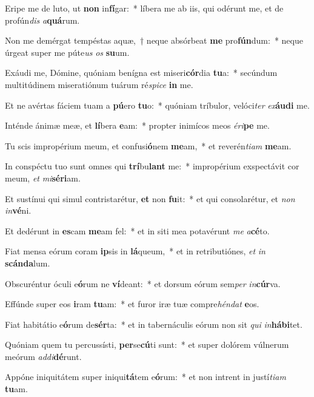 \item Eripe me de luto, ut \textbf{non} in\textbf{fí}gar:~* líbera me ab iis, qui odérunt me, et de profún\textit{dis} \textit{a}\textbf{quá}rum.
\item Non me demérgat tempéstas aquæ,~† neque absórbeat \textbf{me} pro\textbf{fún}dum:~* neque úrgeat super me púte\textit{us} \textit{os} \textbf{su}um.
\item Exáudi me, Dómine, quóniam benígna est miseri\textbf{cór}dia \textbf{tu}a:~* secúndum multitúdinem miseratiónum tuárum ré\textit{spi}\textit{ce} \textbf{in} me.
\item Et ne avértas fáciem tuam a \textbf{pú}ero \textbf{tu}o:~* quóniam tríbulor, velóci\textit{ter} \textit{ex}\textbf{áu}\textbf{di} me.
\item Inténde ánimæ meæ, et \textbf{lí}bera \textbf{e}am:~* propter inimícos meos \textit{é}\textit{ri}\textbf{pe} me.
\item Tu scis impropérium meum, et confusi\textbf{ó}nem \textbf{me}am,~* et reverén\textit{ti}\textit{am} \textbf{me}am.
\item In conspéctu tuo sunt omnes qui \textbf{trí}bu\textbf{lant} me:~* impropérium exspectávit cor meum, \textit{et} \textit{mi}\textbf{sé}\textbf{ri}am.
\item Et sustínui qui simul contristarétur, \textbf{et} non \textbf{fu}it:~* et qui consolarétur, et \textit{non} \textit{in}\textbf{vé}ni.
\item Et dedérunt in \textbf{es}cam \textbf{me}am fel:~* et in siti mea potavérunt \textit{me} \textit{a}\textbf{cé}to.
\item Fiat mensa eórum coram \textbf{ip}sis in \textbf{lá}queum,~* et in retributiónes, \textit{et} \textit{in} \textbf{scán}\textbf{da}lum.
\item Obscuréntur óculi e\textbf{ó}rum ne \textbf{ví}deant:~* et dorsum eórum sem\textit{per} \textit{in}\textbf{cúr}va.
\item Effúnde super eos \textbf{i}ram \textbf{tu}am:~* et furor iræ tuæ compre\textit{hén}\textit{dat} \textbf{e}os.
\item Fiat habitátio e\textbf{ó}rum de\textbf{sér}ta:~* et in tabernáculis eórum non sit \textit{qui} \textit{in}\textbf{há}\textbf{bi}tet.
\item Quóniam quem tu percussísti, \textbf{per}se\textbf{cú}ti sunt:~* et super dolórem vúlnerum meórum \textit{ad}\textit{di}\textbf{dé}runt.
\item Appóne iniquitátem super iniqui\textbf{tá}tem e\textbf{ó}rum:~* et non intrent in justí\textit{ti}\textit{am} \textbf{tu}am.
